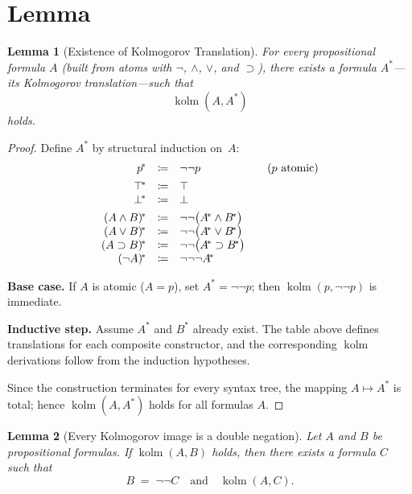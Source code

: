 \documentclass{article}
\newtheorem{lemma}{Lemma}
\begin{document}
\section{Lemma}
\begin{lemma}[Existence of Kolmogorov Translation]\label{lem:exists-kolm}
  For every propositional formula $A$ (built from atoms with
  $\neg$, $\land$, $\lor$, and $\supset$), there exists a formula
  $A^{\!*}$—its Kolmogorov translation—such that
  \[
    \operatorname{kolm}(A,A^{\!*})
  \]
  holds.
  \end{lemma}
  
  \begin{proof}
  Define $A^{\!*}$ by structural induction on $A$:
  \[
  \begin{array}{rcl@{\qquad}l}
  p^{\!*}              &\coloneqq& \neg\neg p &(\text{$p$ atomic})\\[4pt]
  \top^{\!*}           &\coloneqq& \top\\
  \bot^{\!*}           &\coloneqq& \bot\\[4pt]
  (A \land B)^{\!*}    &\coloneqq& \neg\neg\bigl(A^{\!*}\land B^{\!*}\bigr)\\
  (A \lor  B)^{\!*}    &\coloneqq& \neg\neg\bigl(A^{\!*}\lor  B^{\!*}\bigr)\\
  (A \supset B)^{\!*}  &\coloneqq& \neg\neg\bigl(A^{\!*}\supset B^{\!*}\bigr)\\
  (\neg A)^{\!*}       &\coloneqq& \neg\neg\neg A^{\!*}
  
  \end{array}
  \]
  
  \noindent
  \textbf{Base case.}  If $A$ is atomic ($A=p$), set $A^{\!*}=\neg\neg p$; then
  $\operatorname{kolm}(p,\neg\neg p)$ is immediate.
  
  \smallskip
  \noindent
  \textbf{Inductive step.}  Assume $A^{\!*}$ and $B^{\!*}$ already exist.
  The table above defines translations for each composite constructor,
  and the corresponding $\operatorname{kolm}$ derivations follow from
  the induction hypotheses.
  
  \smallskip
  Since the construction terminates for every syntax tree, the
  mapping $A\mapsto A^{\!*}$ is total; hence
  $\operatorname{kolm}(A,A^{\!*})$ holds for all formulas $A$.
  \end{proof}


  \begin{lemma}[Every Kolmogorov image is a double negation]
    \label{lem:outer-dneg}
    Let $A$ and $B$ be propositional formulas.
    If \(\operatorname{kolm}(A,B)\) holds, then there exists a formula
    \(C\) such that
    \[
       B \;=\; \neg\neg C
       \quad\text{and}\quad
       \operatorname{kolm}(A,C).
    \]
    \end{lemma}
    
\end{document}
